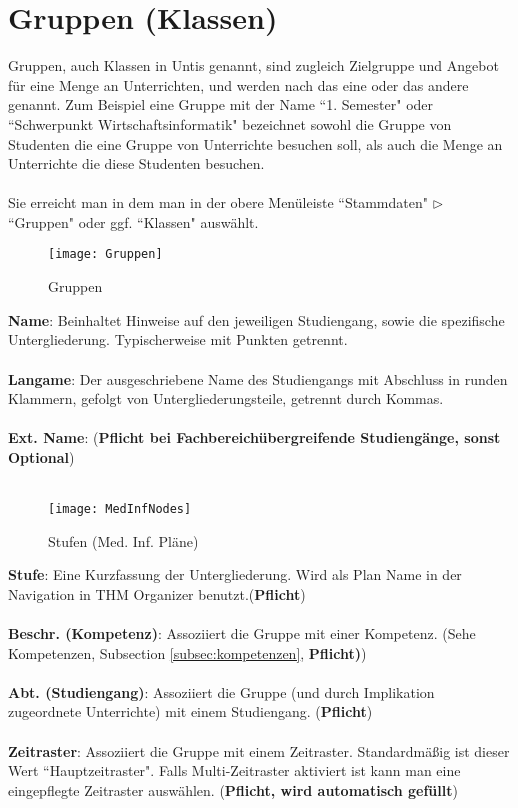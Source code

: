 \newpage
\section{Gruppen (Klassen)}

Gruppen, auch Klassen in Untis genannt, sind zugleich Zielgruppe und Angebot für eine Menge an Unterrichten, und werden nach das eine oder das andere genannt. Zum Beispiel eine Gruppe mit der Name ``1. Semester" oder ``Schwerpunkt Wirtschaftsinformatik" bezeichnet sowohl die Gruppe von Studenten die eine Gruppe von Unterrichte besuchen soll, als auch die Menge an Unterrichte die diese Studenten besuchen.\\
\\
Sie erreicht man in dem man in der obere Menüleiste ``Stammdaten" $\triangleright$ ``Gruppen" oder ggf. ``Klassen" auswählt.

\begin{figure}[h]
	\texttt{[image: Gruppen]}
	\vspace{-15pt}
	\caption{Gruppen}
	\label{fig:groups}
\end{figure}

\noindent
\textbf{Name}: Beinhaltet Hinweise auf den jeweiligen Studiengang, sowie die spezifische Untergliederung. Typischerweise mit Punkten getrennt.\\
\\
\textbf{Langame}: Der ausgeschriebene Name des Studiengangs mit Abschluss in runden Klammern, gefolgt von Untergliederungsteile, getrennt durch Kommas.\\
\\
\textbf{Ext. Name}: (\textbf{Pflicht bei Fachbereichübergreifende Studiengänge, sonst Optional})\\
\\
\begin{wrapfigure}{r}{0.4\textwidth}
	\vspace{-10pt}
	\texttt{[image: MedInfNodes]}
	\vspace{-5pt}
	\caption{Stufen (Med. Inf. Pläne)}
	\label{fig:steps}
\end{wrapfigure}
\textbf{Stufe}: Eine Kurzfassung der Untergliederung. Wird als Plan Name in der Navigation in THM Organizer benutzt.(\textbf{Pflicht})\\
\\
\textbf{Beschr. (Kompetenz)}: Assoziiert die Gruppe mit einer Kompetenz. (Sehe Kompetenzen, Subsection  \ref{subsec:kompetenzen}, \textbf{Pflicht)})\\
\\
\textbf{Abt. (Studiengang)}: Assoziiert die Gruppe (und durch Implikation zugeordnete Unterrichte) mit einem Studiengang. (\textbf{Pflicht})\\
\\
\textbf{Zeitraster}: Assoziiert die Gruppe mit einem Zeitraster. Standardmäßig ist dieser Wert ``Hauptzeitraster". Falls Multi-Zeitraster aktiviert ist kann man eine eingepflegte Zeitraster auswählen. (\textbf{Pflicht, wird automatisch gefüllt})

